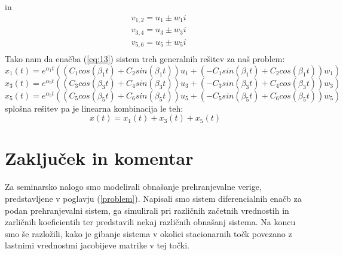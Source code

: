 \documentclass[a4paper, 12pt]{article}
\begin{document}
in
\begin{align*}
	&v_{1,2} = u_{1} \pm w_{1}i \\
	&v_{3,4} = u_{3} \pm w_{3}i \\
	&v_{5,6} = u_{5} \pm w_{5}i \\
\end{align*}
Tako nam da enačba (\ref{eq:13}) sistem treh generalnih rešitev za naš problem:
\begin{equation}
	x_{1}(t) = e^{\alpha_{1} t}((C_{1}cos(\beta_{1} t)+C_{2}sin(\beta_{1} t))u_{1}+(-C_{1}sin(\beta_{1} t)+C_{2}cos(\beta_{1} t))w_{1})
\end{equation}
\begin{equation}
	x_{3}(t) = e^{\alpha_{3} t}((C_{3}cos(\beta_{3} t)+C_{4}sin(\beta_{3} t))u_{3}+(-C_{3}sin(\beta_{3} t)+C_{4}cos(\beta_{3} t))w_{3})
\end{equation}
\begin{equation}
	x_{5}(t) = e^{\alpha_{5} t}((C_{5}cos(\beta_{5} t)+C_{6}sin(\beta_{5} t))u_{5}+(-C_{5}sin(\beta_{5} t)+C_{6}cos(\beta_{5} t))w_{5})
\end{equation}
splošna rešitev pa je linearna kombinacija le teh:
\begin{equation}
	x(t) = x_{1}(t) + x_{3}(t) + x_{5}(t)
\end{equation}

\section{Zaključek in komentar}
Za seminarsko nalogo smo modelirali obnašanje prehranjevalne verige, predstavljene v poglavju (\ref{problem}).
Napisali smo sistem diferencialnih enačb za podan prehranjevalni sistem, ga simulirali pri različnih začetnih
vrednostih in zarličnih koeficientih ter predstavili nekaj različnih obnašanj sistema. Na koncu smo še razložili,
kako je gibanje sistema v okolici stacionarnih točk povezano z lastnimi vrednostmi jacobijeve matrike v tej točki.\\
\end{document}
